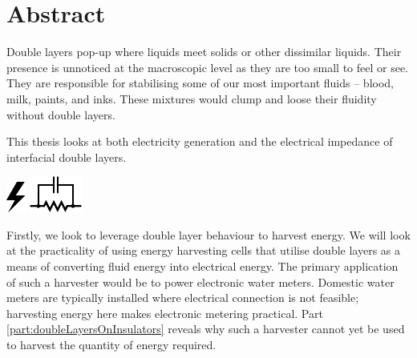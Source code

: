 





\rmfamily

\chapter*{Abstract}
  Double layers pop-up where liquids meet solids or other dissimilar liquids.
  Their presence is unnoticed at the macroscopic level as they are too small to feel or see.
  They are responsible for stabilising some of our most important fluids -- blood, milk, paints, and inks.
  These mixtures would clump and loose their fluidity without double layers.

  \vspace{-0.3cm}
  \begin{center}  
    \parbox{8.8cm}{
      \begin{center}
        This thesis looks at both electricity generation and the electrical impedance of interfacial double layers.
      \end{center}
      \vspace{-1.35cm}
    }
    \vspace{-0.3cm}
    \parbox{15cm}{
        \hspace{0.8cm}
        \hbox{\vspace{-0.9cm}\includegraphics{graphics/logo_electricity}}
        \hbox{\hspace{9.8cm}\includegraphics{graphics/logo_impedance}}
    }
  \end{center}
  \vspace{0.5cm}

  Firstly, we look to leverage double layer behaviour to harvest energy.
  We will look at the practicality of using energy harvesting cells that utilise double layers as a means of converting fluid energy into electrical energy.
  The primary application of such a harvester would be to power electronic water meters.
  Domestic water meters are typically installed where electrical connection is not feasible; harvesting energy here makes electronic metering practical.
  Part \ref{part:doubleLayersOnInsulators} reveals why such a harvester cannot yet be used to harvest the quantity of energy required.

